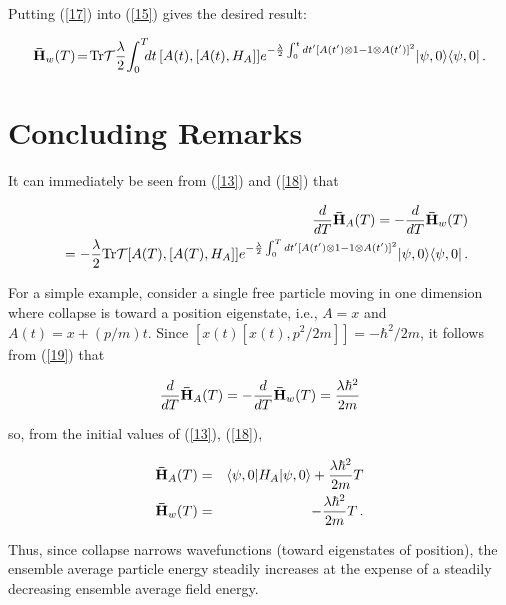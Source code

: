 \documentclass{article}
\begin{document}
\noindent Putting (\ref{17}) into (\ref{15}) gives the desired result:

\begin{eqnarray}\label{18}
{\bf \bar{H}}_{w}(T)\!=\!{\rm Tr}{\cal T}\frac{\lambda}{2}\!\int_{0}^{T}\!\!\!dt\,
[A(t),[A(t),H_{A}]]
e^{-\frac{\lambda}{2}\int_{0}^{t}dt'[A(t')\otimes 1-1\otimes A(t')]^{2}}
	|\psi,0\rangle\langle \psi,0|\, .
\end{eqnarray}

\section{Concluding Remarks}\label{Conclusion}

\hspace{\parindent}It can immediately be seen from (\ref{13}) and (\ref{18}) that 
	
\begin{eqnarray}\label{19}
&&\!\!\!\!\!\!\!\!\!\!\!\!\!\!\!\!\!\!\!\!\!\!\!\!\!\!\!
\frac{d}{dT}{\bf \bar{H}}_{A}(T)=-\frac{d}{dT}{\bf \bar{H}}_{w}(T)\nonumber\\
&&=-\frac{\lambda}{2}{\rm Tr}{\cal T}[A(T),[A(T),H_{A}]]
e^{-\frac{\lambda}{2}\int_{0}^{T}dt'[A(t')\otimes 1-1\otimes A(t')]^{2}}
	|\psi,0\rangle\langle \psi,0|\, .
\end{eqnarray}

	For a simple example, consider a single free particle 
moving in one dimension where collapse is toward a position eigenstate\cite{Diosi 89}, i.e., 
$A=x$ and $A(t)=x+(p/m)t$. Since $[x(t)[x(t),p^{2}/2m]]=-\hbar^{2}/2m$, 
it follows from (\ref{19}) that 

\begin{eqnarray*}
\frac{d}{dT}{\bf \bar{H}}_{A}(T)=-\frac{d}{dT}{\bf \bar{H}}_{w}(T)=
\frac{\lambda \hbar^{2}}{2m}
\end{eqnarray*}

\noindent so, from the initial values of (\ref{13}), (\ref{18}),

\begin{eqnarray*}
{\bf \bar{H}}_{A}(T)&=&\langle\psi,0|H_{A}|\psi,0\rangle + \frac{\lambda \hbar^{2}}{2m}T\\
{\bf \bar{H}}_{w}(T)&=&-\frac{\lambda \hbar^{2}}{2m}T\, . 
\end{eqnarray*}

\noindent Thus, since collapse narrows wavefunctions (toward 
eigenstates of position), the ensemble average particle energy steadily increases 
at the expense of a steadily decreasing ensemble average field energy. 
\end{document}
